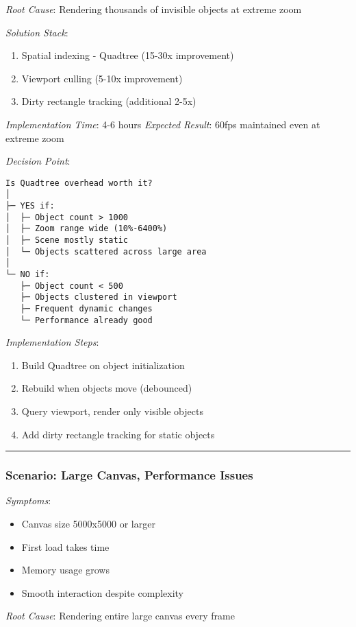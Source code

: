 \documentclass[11pt]{article}
\begin{document}
\emph{Root Cause}: Rendering thousands of invisible objects at extreme zoom

\emph{Solution Stack}:
\begin{enumerate}
\item Spatial indexing - Quadtree (15-30x improvement)
\item Viewport culling (5-10x improvement)
\item Dirty rectangle tracking (additional 2-5x)
\end{enumerate}

\emph{Implementation Time}: 4-6 hours
\emph{Expected Result}: 60fps maintained even at extreme zoom

\emph{Decision Point}: 
\begin{verbatim}
Is Quadtree overhead worth it?
│
├─ YES if:
│  ├─ Object count > 1000
│  ├─ Zoom range wide (10%-6400%)
│  ├─ Scene mostly static
│  └─ Objects scattered across large area
│
└─ NO if:
   ├─ Object count < 500
   ├─ Objects clustered in viewport
   ├─ Frequent dynamic changes
   └─ Performance already good
\end{verbatim}

\emph{Implementation Steps}:
\begin{enumerate}
\item Build Quadtree on object initialization
\item Rebuild when objects move (debounced)
\item Query viewport, render only visible objects
\item Add dirty rectangle tracking for static objects
\end{enumerate}

\noindent\rule{\textwidth}{0.5pt}
\subsubsection{Scenario: Large Canvas, Performance Issues}
\label{sec:orgf0f5dc5}

\emph{Symptoms}:
\begin{itemize}
\item Canvas size 5000x5000 or larger
\item First load takes time
\item Memory usage grows
\item Smooth interaction despite complexity
\end{itemize}

\emph{Root Cause}: Rendering entire large canvas every frame
\end{document}
